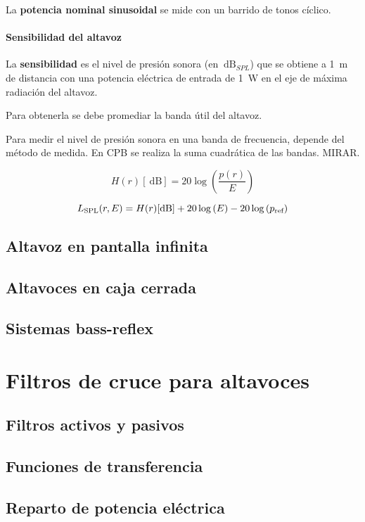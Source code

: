 \documentclass[10pt]{book}
\begin{document}
La \textbf{potencia nominal sinusoidal} se mide con un barrido de tonos cíclico.

\subsubsection{Sensibilidad del altavoz}

La \textbf{sensibilidad} es el nivel de presión sonora (en $\SI{}{\dB_{SPL}}$) que se obtiene a \SI{1}{\metre} de distancia con una potencia eléctrica de entrada de \SI{1}{\watt} en el eje de máxima radiación del altavoz.

Para obtenerla se debe promediar la banda útil del altavoz.


Para medir el nivel de presión sonora en una banda de frecuencia, depende del método de medida. En CPB se realiza la suma cuadrática de las bandas. MIRAR.

\[ H(r) [\SI{}{\dB}] = 20 \log \left( \frac{p(r)}{E} \right)  \]

\[ L _{\textnormal{SPL}} (r,E) = H(r) [\SI{}{\dB}] + 20 \log \left( E 	\right) -20 \log \left( p _{\textnormal{ref}} \right)  \]


\section{Altavoz en pantalla infinita}
\section{Altavoces en caja cerrada}
\section{Sistemas bass-reflex}


\chapter{Filtros de cruce para altavoces}
\section{Filtros activos y pasivos}
\section{Funciones de transferencia}
\section{Reparto de potencia eléctrica}
\end{document}
